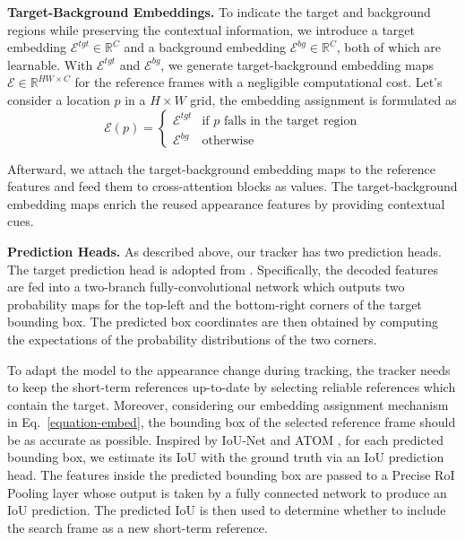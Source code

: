 \textbf{Target-Background Embeddings.} To indicate the target and background regions while preserving the contextual information, we introduce a target embedding $\mathcal{E} ^ {tgt} \in \mathbb{R} ^ {C}$ and a background embedding $\mathcal{E} ^ {bg} \in \mathbb{R} ^ {C}$, both of which are learnable. With $\mathcal{E} ^ {tgt}$ and $\mathcal{E} ^ {bg}$, we generate target-background embedding maps $\mathcal{E} \in \mathbb{R} ^ {HW \times C}$ for the reference frames with a negligible computational cost. Let's consider a location $p$ in a $H \times W$ grid, the embedding assignment is formulated as
\begin{equation}
    \mathcal{E}(p) = \begin{cases} \mathcal{E} ^ {tgt} & \text{if $p$ falls in the target region} \\ \mathcal{E} ^ {bg} & \text{otherwise} \end{cases}
\label{equation-embed}
\end{equation}

Afterward, we attach the target-background embedding maps to the reference features and feed them to cross-attention blocks as values. The target-background embedding maps enrich the reused appearance features by providing contextual cues.

\textbf{Prediction Heads.} As described above, our tracker has two prediction heads. The target prediction head is adopted from \cite{yan2021learning}. Specifically, the decoded features are fed into a two-branch fully-convolutional network which outputs two probability maps for the top-left and the bottom-right corners of the target bounding box. The predicted box coordinates are then obtained by computing the expectations of the probability distributions of the two corners.

To adapt the model to the appearance change during tracking, the tracker needs to keep the short-term references up-to-date by selecting reliable references which contain the target. Moreover, considering our embedding assignment mechanism in Eq.~\ref{equation-embed}, the bounding box of the selected reference frame should be as accurate as possible. Inspired by IoU-Net \cite{jiang2018acquisition} and ATOM \cite{danelljan2019atom}, for each predicted bounding box, we estimate its IoU with the ground truth via an IoU prediction head. The features inside the predicted bounding box are passed to a Precise RoI Pooling layer whose output is taken by a fully connected network to produce an IoU prediction. The predicted IoU is then used to determine whether to include the search frame as a new short-term reference.


